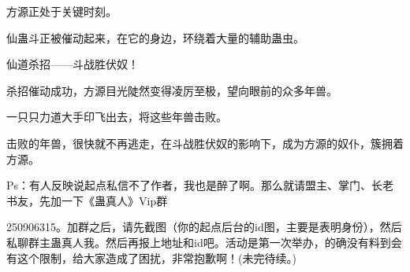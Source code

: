 \begin{this_body}
方源正处于关键时刻。

仙蛊斗正被催动起来，在它的身边，环绕着大量的辅助蛊虫。

仙道杀招——斗战胜伏奴！

杀招催动成功，方源目光陡然变得凌厉至极，望向眼前的众多年兽。

一只只力道大手印飞出去，将这些年兽击败。

击败的年兽，很快就不再逃走，在斗战胜伏奴的影响下，成为方源的奴仆，簇拥着方源。

Ps：有人反映说起点私信不了作者，我也是醉了啊。那么就请盟主、掌门、长老书友，先加一下《蛊真人》Vip群

250906315。加群之后，请先截图（你的起点后台的id图，主要是表明身份），然后私聊群主蛊真人我。然后再报上地址和id吧。活动是第一次举办，的确没有料到会有这个限制，给大家造成了困扰，非常抱歉啊！(未完待续。)

\end{this_body}

